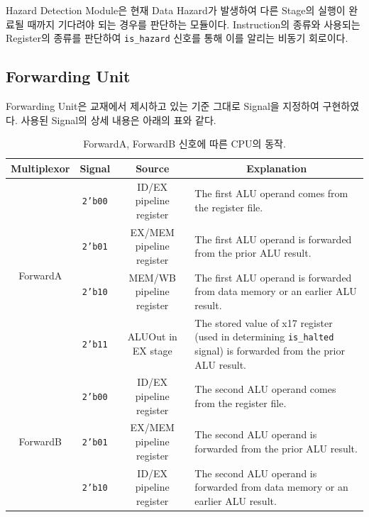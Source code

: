 \documentclass[openright, a4paper]{article}
\newcommand{\code}[1]{\texttt{#1}}
\begin{document}
Hazard Detection Module은 현재 Data Hazard가 발생하여 다른 Stage의 실행이 완료될 때까지 기다려야 되는 경우를 판단하는 모듈이다. Instruction의 종류와 사용되는 Register의 종류를 판단하여 \code{is_hazard} 신호를 통해 이를 알리는 비동기 회로이다.

\subsection{Forwarding Unit}

Forwarding Unit은 교재에서 제시하고 있는 기준 그대로 Signal을 지정하여 구현하였다. 사용된 Signal의 상세 내용은 아래의 표와 같다.

\begin{table}[h!]
    \centering
    \renewcommand{\arraystretch}{1.2}
    \begin{tabular}{c|c|c|p{6cm}}
    \hline
    Multiplexor & Signal     & Source                   & \multicolumn{1}{c}{Explanation}                                                                                                    \\
    \hline
    \multirow{4}{*}{ForwardA} & \code{2'b00} & ID/EX pipeline register  & The first ALU operand comes from the register file.                                                            \\
    \cline{2-4}
    & \code{2'b01} & EX/MEM pipeline register & The first ALU operand is forwarded from the prior ALU result.                                                  \\
    \cline{2-4}
    & \code{2'b10} & MEM/WB pipeline register & The first ALU operand is forwarded from data memory or an earlier ALU result.                                  \\
    \cline{2-4}
    & \code{2'b11} & ALUOut in EX stage       & The stored value of x17 register (used in determining \code{is\_halted} signal) is forwarded from the prior ALU result. \\
    \hline
    \multirow{3}{*}{ForwardB} & \code{2'b00} & ID/EX pipeline register  & The second ALU operand comes from the register file.                                                           \\
    \cline{2-4}
    & \code{2'b01} & EX/MEM pipeline register & The second ALU operand is forwarded from the prior ALU result.                                                 \\
    \cline{2-4}
    & \code{2'b10} & ID/EX pipeline register  & The second ALU operand is forwarded from data memory or an earlier ALU result.                                \\
    \hline
    \end{tabular}
    \caption{ForwardA, ForwardB 신호에 따른 CPU의 동작.}
\end{table}
\end{document}
